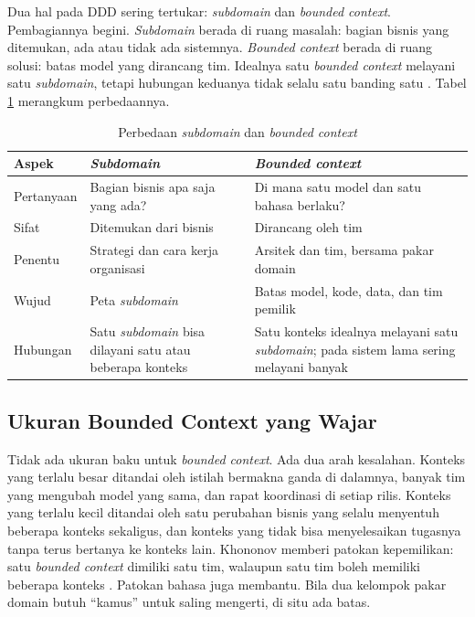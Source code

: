 Dua hal pada DDD sering tertukar: \textit{subdomain} dan \textit{bounded context}. Pembagiannya
begini. \textit{Subdomain} berada di ruang masalah: bagian bisnis yang ditemukan, ada atau tidak
ada sistemnya. \textit{Bounded context} berada di ruang solusi: batas model yang dirancang tim.
Idealnya satu \textit{bounded context} melayani satu \textit{subdomain}, tetapi hubungan keduanya
tidak selalu satu banding satu \cite{c06-khononov2021}. Tabel \ref{tab:ch06-subdomain-konteks}
merangkum perbedaannya.

\begin{table}[!htb]
  \centering
  \caption{Perbedaan \textit{subdomain} dan \textit{bounded context}}
  \label{tab:ch06-subdomain-konteks}
  \footnotesize
  \begin{tabularx}{\textwidth}{>{\raggedright\arraybackslash}p{2.4cm} >{\raggedright\arraybackslash}X >{\raggedright\arraybackslash}X}
    \hline
    \textbf{Aspek} & \textbf{\textit{Subdomain}} & \textbf{\textit{Bounded context}} \\ \hline
    Pertanyaan & Bagian bisnis apa saja yang ada? & Di mana satu model dan satu bahasa berlaku?
      \\ \hline
    Sifat & Ditemukan dari bisnis & Dirancang oleh tim \\ \hline
    Penentu & Strategi dan cara kerja organisasi & Arsitek dan tim, bersama pakar domain \\
      \hline
    Wujud & Peta \textit{subdomain} & Batas model, kode, data, dan tim pemilik \\ \hline
    Hubungan & Satu \textit{subdomain} bisa dilayani satu atau beberapa konteks & Satu konteks
      idealnya melayani satu \textit{subdomain}; pada sistem lama sering melayani banyak \\ \hline
  \end{tabularx}
\end{table}

\subsection{Ukuran Bounded Context yang Wajar}

Tidak ada ukuran baku untuk \textit{bounded context}. Ada dua arah kesalahan. Konteks yang terlalu
besar ditandai oleh istilah bermakna ganda di dalamnya, banyak tim yang mengubah model yang sama,
dan rapat koordinasi di setiap rilis. Konteks yang terlalu kecil ditandai oleh satu perubahan bisnis
yang selalu menyentuh beberapa konteks sekaligus, dan konteks yang tidak bisa menyelesaikan tugasnya
tanpa terus bertanya ke konteks lain. Khononov memberi patokan kepemilikan: satu \textit{bounded
context} dimiliki satu tim, walaupun satu tim boleh memiliki beberapa konteks
\cite{c06-khononov2021}. Patokan bahasa juga membantu. Bila dua kelompok pakar domain butuh
``kamus'' untuk saling mengerti, di situ ada batas.

